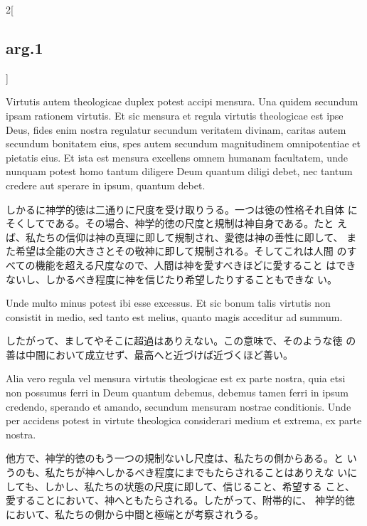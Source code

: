 \documentclass[paper=a4paper,fontsize=10pt,jafontsize=9pt,titlepage]{jlreq}
\begin{document}
\begin{paracol}{2}[\subsection{arg.1}]
\switchcolumn*

Virtutis autem theologicae duplex potest accipi mensura. Una quidem
 secundum ipsam rationem virtutis.  Et sic mensura et regula virtutis
 theologicae est ipse Deus, fides enim nostra regulatur secundum
 veritatem divinam, caritas autem secundum bonitatem eius, spes autem
 secundum magnitudinem omnipotentiae et pietatis eius. Et ista est
 mensura excellens omnem humanam facultatem, unde nunquam potest homo
 tantum diligere Deum quantum diligi debet, nec tantum credere aut
 sperare in ipsum, quantum debet.

\switchcolumn

しかるに神学的徳は二通りに尺度を受け取りうる。一つは徳の性格それ自体
 にそくしてである。その場合、神学的徳の尺度と規制は神自身である。たと
 えば、私たちの信仰は神の真理に即して規制され、愛徳は神の善性に即して、
 また希望は全能の大きさとその敬神に即して規制される。そしてこれは人間
 のすべての機能を超える尺度なので、人間は神を愛すべきほどに愛すること
 はできないし、しかるべき程度に神を信じたり希望したりすることもできな
 い。

\switchcolumn*

Unde multo minus potest ibi esse excessus. Et sic bonum talis virtutis
non consistit in medio, sed tanto est melius, quanto magis acceditur
 ad summum.

\switchcolumn

したがって、ましてやそこに超過はありえない。この意味で、そのような徳
 の善は中間において成立せず、最高へと近づけば近づくほど善い。

\switchcolumn*

Alia vero regula vel mensura virtutis theologicae est ex
parte nostra, quia etsi non possumus ferri in Deum quantum debemus,
debemus tamen ferri in ipsum credendo, sperando et amando, secundum
mensuram nostrae conditionis. Unde per accidens potest in virtute
theologica considerari medium et extrema, ex parte nostra.

\switchcolumn

他方で、神学的徳のもう一つの規制ないし尺度は、私たちの側からある。と
 いうのも、私たちが神へしかるべき程度にまでもたらされることはありえな
 いにしても、しかし、私たちの状態の尺度に即して、信じること、希望する
 こと、愛することにおいて、神へともたらされる。したがって、附帯的に、
 神学的徳において、私たちの側から中間と極端とが考察されうる。

\switchcolumn*[\subsection{ad.1}]


\end{paracol}
\end{document}
